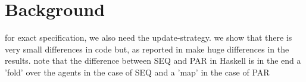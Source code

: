 \section{Background}

for exact specification, we also need the update-strategy. we show that there is very small differences in code but, as reported in \cite{thaler paper} make huge differences in the results. note that the difference between SEQ and PAR in Haskell is in the end a 'fold' over the agents in the case of SEQ and a 'map' in the case of PAR